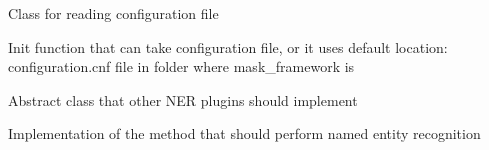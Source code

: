 \documentclass[letterpaper,10pt,english]{sphinxmanual}
\begin{document}
\label{\detokenize{contents:module-masking_plugins}}

\begin{fulllineitems}
Class for reading configuration file

Init function that can take configuration file, or it uses default location: configuration.cnf file in folder
where mask\_framework is

\end{fulllineitems}


\begin{fulllineitems}
\label{\detokenize{contents:ner_plugins.NER_abstract.NER_abstract}}
Abstract class that other NER plugins should implement

\begin{fulllineitems}
\label{\detokenize{contents:ner_plugins.NER_abstract.NER_abstract.perform_NER}}
Implementation of the method that should perform named entity recognition

\end{fulllineitems}


\end{fulllineitems}

\end{document}
